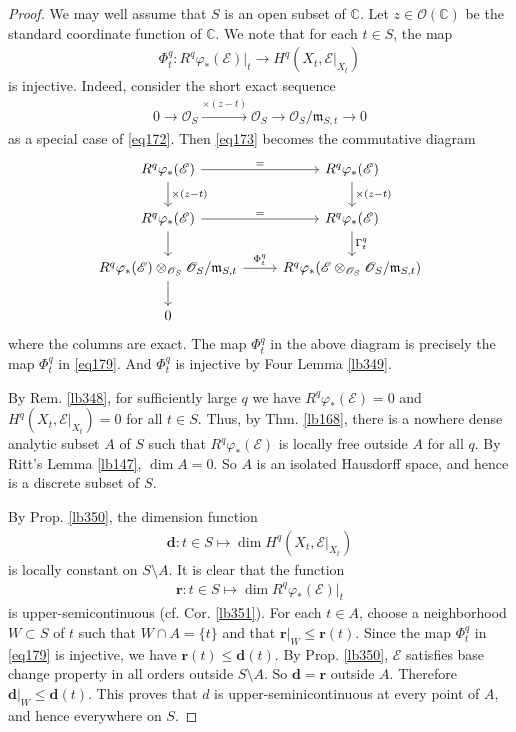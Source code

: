 \documentclass[12pt,b5paper,notitlepage]{report}
\theoremstyle{definition}
\theoremstyle{plain}
\newcommand{\scr}{\mathscr}
\newcommand{\mbf}{\mathbf}
\newcommand{\Cbb}{\mathbb C}
\newcommand{\mk}{\mathfrak m}
\numberwithin{equation}{section}
\begin{document}
\begin{proof}
We may well assume that $S$ is an open subset of $\Cbb$. Let $z\in\scr O(\Cbb)$ be the standard coordinate function of $\Cbb$. We note that for each $t\in S$, the map
\begin{align}
\Phi_t^q: R^q\varphi_*(\scr E)|_t\rightarrow H^q(X_t,\scr E|_{X_t})  \label{eq179}
\end{align}
is injective. Indeed, consider the short exact sequence
\begin{align*}
0\rightarrow \scr O_S\xrightarrow{\times (z-t)}\scr O_S\rightarrow \scr O_S/\mk_{S,t}\rightarrow 0
\end{align*}
as a special case of \eqref{eq172}. Then \eqref{eq173} becomes the commutative diagram
\begin{equation}\label{eq180}
\begin{tikzcd}
R^q\varphi_*(\scr E)\arrow[r,"="] \arrow[d,"\times (z-t)"]           & R^q\varphi_*(\scr E) \arrow[d,"\times (z-t)"]           \\
R^q\varphi_*(\scr E) \arrow[d] \arrow[r, "="] & R^q\varphi_*(\scr E) \arrow[d, "\Gamma_t^q"] \\
R^q\varphi_*(\scr E)\otimes_{\scr O_S}\scr O_S/\mk_{S,t} \arrow[r, "\Phi_t^q"] \arrow[d]   & R^q\varphi_*(\scr E\otimes_{\scr O_S}\scr O_S/\mk_{S,t})                     \\
0                               &                      
\end{tikzcd}
\end{equation}
where the columns are exact. The map $\Phi_t^q$ in the above diagram is precisely the map $\Phi_t^q$ in \eqref{eq179}. And $\Phi_t^q$ is injective by Four Lemma \ref{lb349}. 


By Rem. \ref{lb348}, for sufficiently large $q$ we have $R^q\varphi_*(\scr E)=0$ and $H^q(X_t,\scr E|_{X_t})=0$ for all $t\in S$. Thus, by Thm. \ref{lb168}, there is a nowhere dense analytic subset $A$ of $S$ such that $R^q\varphi_*(\scr E)$ is locally free outside $A$ for all $q$. By Ritt's Lemma \ref{lb147}, $\dim A=0$. So $A$ is an isolated Hausdorff space, and hence is a discrete subset of $S$.

By Prop. \ref{lb350}, the dimension function
\begin{align*}
\mbf d:t\in S\mapsto \dim H^q(X_t,\scr E|_{X_t})
\end{align*}
is locally constant on $S\setminus A$. It is clear that the function
\begin{align*}
\mbf r:t\in S\mapsto \dim R^q\varphi_*(\scr E)|_t
\end{align*}
is upper-semicontinuous (cf. Cor. \ref{lb351}). For each $t\in A$, choose a neighborhood $W\subset S$ of $t$ such that $W\cap A=\{t\}$ and that $\mbf r|_W\leq \mbf r(t)$. Since the map $\Phi_t^q$ in \eqref{eq179} is injective, we have $\mbf r(t)\leq \mbf d(t)$. By Prop. \ref{lb350}, $\scr E$ satisfies base change property in all orders outside $S\setminus A$. So $\mbf d=\mbf r$ outside $A$. Therefore $\mbf d|_W\leq\mbf d(t)$. This proves that $d$ is upper-seminicontinuous at every point of $A$, and hence everywhere on $S$.
\end{proof}
\end{document}
